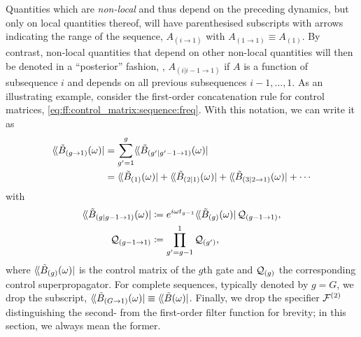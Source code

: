 Quantities which are \emph{non-local} and thus depend on the preceding dynamics, but only on local quantities thereof, will have parenthesised subscripts with arrows indicating the range of the sequence, \eg $A_{(i\to 1)}$ with $A_{(1\to 1)}\equiv A_{(1)}$.
By contrast, non-local quantities that depend on other non-local quantities will then be denoted in a \enquote{posterior} fashion, \eg, $A_{(i|i-1\to 1)}$ if $A$ is a function of subsequence $i$ and depends on all previous subsequences $i-1, \dotsc, 1$.
As an illustrating example, consider the first-order concatenation rule for control matrices, \cref{eq:ff:control_matrix:sequence:freq}.
With this notation, we can write it as
\begin{align}\label{eq:app:ff:ctrlmat_cumulative}
    \dbra*{\Bt_{(g\to 1)}(\omega)} &= \sum_{g^{\prime}=1}^{g}\dbra*{\Bt_{(g^{\prime}|g^{\prime}-1\to 1)}(\omega)} \\
                                   &= \dbra*{\Bt_{(1)}(\omega)} + \dbra*{\Bt_{(2|1)}(\omega)} + \dbra*{\Bt_{(3|2\to 1)}(\omega)} + \cdots\notag
\end{align}
with
\begin{align}
    \dbra*{\Bt_{(g|g-1\to 1)}(\omega)}
        &\coloneqq \e^{\i\omega t_{g-1}}\dbra*{\Bt_{(g)}(\omega)}\liouvQ_{(g-1\to 1)}, \label{eq:app:ff:ctrlmat_step} \\
    \liouvQ_{(g-1\to 1)}
        &\coloneqq \prod_{g^{\prime}=g-1}^1 \liouvQ_{(g^{\prime})},
\end{align}
where $\dbra*{\Bt_{(g)}(\omega)}$ is the control matrix of the $g$th gate and $\mathcal{Q}_{(g)}$ the corresponding control superpropagator.
For complete sequences, typically denoted by $g = G$, we drop the subscript, $\dbra*{\Bt_{(G\to 1)}(\omega)}\equiv\dbra*{\Bt(\omega)}$.
Finally, we drop the specifier $\mathcal{F}^{(2)}$ distinguishing the second- from the first-order filter function for brevity; in this section, we always mean the former.

